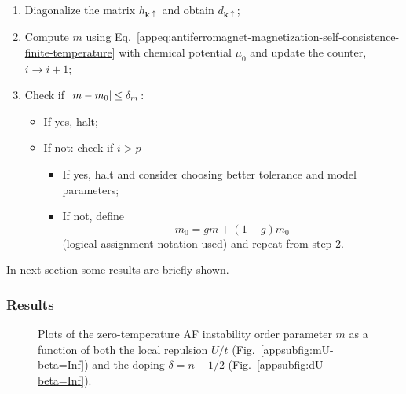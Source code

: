 \begin{enumerate}
	\item Diagonalize the matrix $h_{\mathbf{k}\uparrow}$ and obtain $d_{\mathbf{k}\uparrow}$;
	\item Compute $m$ using Eq.~\eqref{appeq:antiferromagnet-magnetization-self-consistence-finite-temperature} with chemical potential $\mu_0$ and update the counter, $i \to i+1$;
	\item Check if $\abs{m-m_0} \le \delta_m$:
	\begin{itemize}
		\item If yes, halt;
		\item If not: check if $i > p$
		\begin{itemize}
			\item If yes, halt and consider choosing better tolerance and model parameters;
			\item If not, define 
			\[
				m_0 = gm + (1-g)m_0
			\]
			(logical assignment notation used) and repeat from step 2.
		\end{itemize}
	\end{itemize}
\end{enumerate}
In next section some results are briefly shown.

\subsubsection{Results}

\begin{figure}
	\centering
	\caption{Plots of the zero-temperature AF instability order parameter $m$ as a function of both the local repulsion $U/t$ (Fig.~\ref{appsubfig:mU-beta=Inf}) and the doping $\delta = n-1/2$ (Fig.~\ref{appsubfig:dU-beta=Inf}).}
	\label{appfig:mdU-beta=Inf}
\end{figure}


